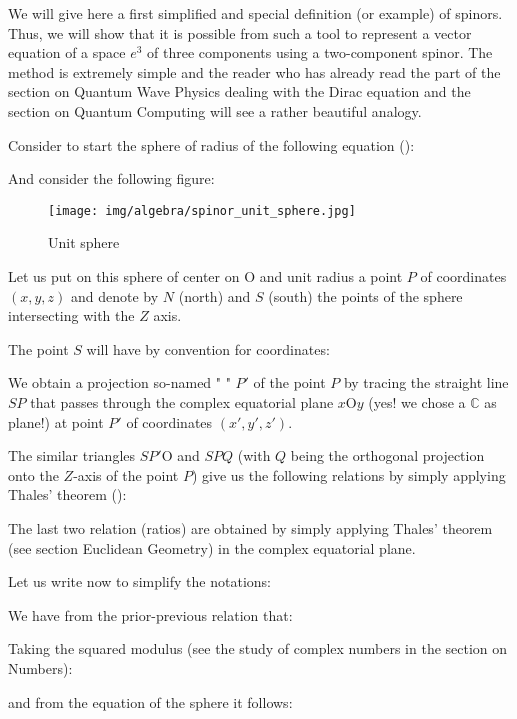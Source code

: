 	We will give here a first simplified and special definition (or example) of spinors. Thus, we will show that it is possible from such a tool to represent a vector equation of a space $e^3$ of three components using a two-component spinor. The method is extremely simple and the reader who has already read the part of the section on Quantum Wave Physics dealing with the Dirac equation and the section on Quantum Computing will see a rather beautiful analogy.
	
	Consider to start the sphere of radius of the following equation ():
	
	And consider the following figure:
\begin{figure}[H]
\centering
\texttt{[image: img/algebra/spinor\_unit\_sphere.jpg]}
\caption[]{Unit sphere}
\end{figure}
Let us put on this sphere of center on O and unit radius a point $P$ of coordinates $(x,y,z)$  and denote by $N$ (north) and $S$ (south) the points of the sphere intersecting with the $Z$ axis.

The point $S$ will have by convention for coordinates:
	
We obtain a projection so-named " " $P'$ of the point $P$ by tracing the straight line $SP$ that passes through the complex equatorial plane $x\text{O}y$  (yes! we chose a $\mathbb{C}$ as plane!) at point $P'$ of coordinates $(x', y', z')$.

The similar triangles $SP'\text{O}$ and $SPQ$ (with $Q$ being the orthogonal projection onto the $Z$-axis of the point $P$) give us the following relations by simply applying Thales' theorem ():
	
	
	\begin{tcolorbox}[title=Remark,colframe=black,arc=10pt]
The last two relation (ratios) are obtained by simply applying Thales' theorem (see section Euclidean Geometry) in the complex equatorial plane.
	\end{tcolorbox}
	
	Let us write now to simplify the notations:
	
	We have from the prior-previous relation that:
	
	Taking the squared modulus (see the study of complex numbers in the section on Numbers):
	
	and from  the equation of the sphere it follows:
	
